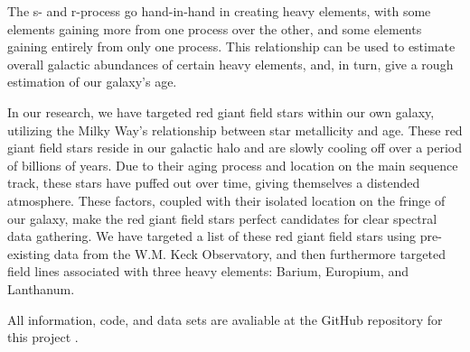 The s- and r-process go hand-in-hand in creating heavy elements, with some elements gaining more from one process over the other, and some elements gaining entirely from only one process. This relationship can be used to estimate overall galactic abundances of certain heavy elements, and, in turn, give a rough estimation of our galaxy's age.

In our research, we have targeted red giant field stars within our own galaxy, utilizing the Milky Way's relationship between star metallicity and age. These red giant field stars reside in our galactic halo and are slowly cooling off over a period of billions of years. Due to their aging process and location on the main sequence track, these stars have puffed out over time, giving themselves a distended atmosphere. These factors, coupled with their isolated location on the fringe of our galaxy, make the red giant field stars perfect candidates for clear spectral data gathering. We have targeted a list of these red giant field stars using pre-existing data from the W.M. Keck Observatory, and then furthermore targeted field lines associated with three heavy elements: Barium, Europium, and Lanthanum. 

All information, code, and data sets are avaliable at the GitHub repository for this project \cite{github}.
